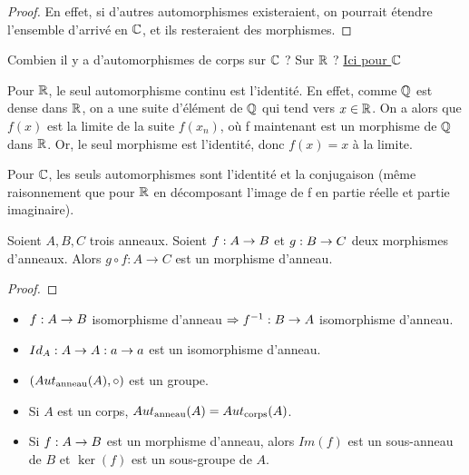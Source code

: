 \ifdefined\outputproof
\begin{proof}
	En effet, si d'autres automorphismes existeraient, on pourrait étendre
	l'ensemble d'arrivé en $\mathbb{C}$, et ils resteraient des morphismes.
\end{proof}
\fi

\begin{question}
	Combien il y a d'automorphismes de corps sur $\mathbb{C}$ ? Sur $\mathbb{R}$ ?
	\href{http://www.math.uga.edu/~pete/Kestelman51.pdf}{Ici pour $\mathbb{C}$}

	Pour $\mathbb{R}$, le seul automorphisme continu est l'identité. En effet, comme
	$\mathbb{Q}$ est dense dans $\mathbb{R}$, on a une suite d'élément de $\mathbb{Q}$
	qui tend vers $x \in \mathbb{R}$. On a alors que $f(x)$ est la limite de la suite
	$f(x_{n})$, où f maintenant est un morphisme de $\mathbb{Q}$ dans $\mathbb{R}$.
	Or, le seul morphisme est l'identité, donc $f(x) = x$ à la limite.

	Pour $\mathbb{C}$, les seuls automorphismes sont l'identité et la conjugaison
	(même raisonnement que pour $\mathbb{R}$ en décomposant l'image de f en partie
	réelle et partie imaginaire).
\end{question}

\begin{proposition}
	Soient $A, B, C$ trois anneaux.
	Soient $f : A \rightarrow B$ et $g : B \rightarrow C$ deux morphismes
	d'anneaux. Alors $g \circ f : A \rightarrow C$ est un morphisme d'anneau.
\end{proposition}

\ifdefined\outputproof
\begin{proof}

\end{proof}
\fi

\begin{proposition}
	\begin{itemize}
		\item $f : A \rightarrow B$ isomorphisme d'anneau $\Rightarrow
			f^{-1} : B \rightarrow A$ isomorphisme d'anneau.
		\item $Id_{A} : A \rightarrow A : a \rightarrow a$ est un isomorphisme
			d'anneau.
		\item $(Aut_{\text{anneau}}(A), \circ)$ est un groupe.
		\item Si $A$ est un corps, $Aut_{\text{anneau}}(A) =
			Aut_{\text{corps}}(A)$.
		\item Si $f : A \rightarrow B$ est un morphisme d'anneau, alors
			$Im(f)$ est un sous-anneau de $B$ et $\ker(f)$ est un sous-groupe de
			$A$.
	\end{itemize}
\end{proposition}

